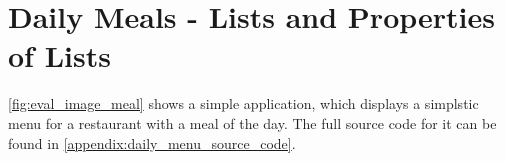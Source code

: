




\section{Daily Meals - Lists and Properties of Lists}

\ref{fig:eval_image_meal} shows a simple application, which displays a simplstic menu for a restaurant with a meal of the day. The full source code for it can be found in \ref{appendix:daily_menu_source_code}.


